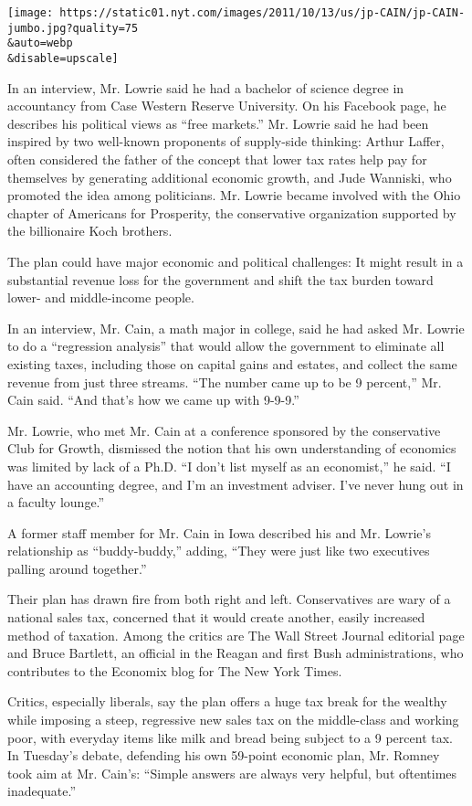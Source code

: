 \texttt{[image: https://static01.nyt.com/images/2011/10/13/us/jp-CAIN/jp-CAIN-jumbo.jpg?quality=75\\\&auto=webp\\\&disable=upscale]}

In an interview, Mr. Lowrie said he had a bachelor of science degree in
accountancy from Case Western Reserve University. On his Facebook page,
he describes his political views as ``free markets.'' Mr. Lowrie said he
had been inspired by two well-known proponents of supply-side thinking:
Arthur Laffer, often considered the father of the concept that lower tax
rates help pay for themselves by generating additional economic growth,
and Jude Wanniski, who promoted the idea among politicians. Mr. Lowrie
became involved with the Ohio chapter of Americans for Prosperity, the
conservative organization supported by the billionaire Koch brothers.

The plan could have major economic and political challenges: It might
result in a substantial revenue loss for the government and shift the
tax burden toward lower- and middle-income people.

In an interview, Mr. Cain, a math major in college, said he had asked
Mr. Lowrie to do a ``regression analysis'' that would allow the
government to eliminate all existing taxes, including those on capital
gains and estates, and collect the same revenue from just three streams.
``The number came up to be 9 percent,'' Mr. Cain said. ``And that's how
we came up with 9-9-9.''

Mr. Lowrie, who met Mr. Cain at a conference sponsored by the
conservative Club for Growth, dismissed the notion that his own
understanding of economics was limited by lack of a Ph.D. ``I don't list
myself as an economist,'' he said. ``I have an accounting degree, and
I'm an investment adviser. I've never hung out in a faculty lounge.''

A former staff member for Mr. Cain in Iowa described his and Mr.
Lowrie's relationship as ``buddy-buddy,'' adding, ``They were just like
two executives palling around together.''

Their plan has drawn fire from both right and left. Conservatives are
wary of a national sales tax, concerned that it would create another,
easily increased method of taxation. Among the critics are The Wall
Street Journal editorial page and Bruce Bartlett, an official in the
Reagan and first Bush administrations, who contributes to the Economix
blog for The New York Times.

Critics, especially liberals, say the plan offers a huge tax break for
the wealthy while imposing a steep, regressive new sales tax on the
middle-class and working poor, with everyday items like milk and bread
being subject to a 9 percent tax. In Tuesday's debate, defending his own
59-point economic plan, Mr. Romney took aim at Mr. Cain's: ``Simple
answers are always very helpful, but oftentimes inadequate.''

